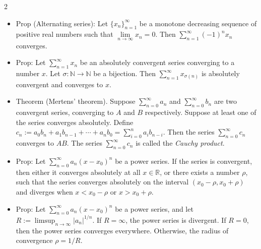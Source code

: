 \documentclass[a4paper,10pt]{article}
\begin{document}
\begin{multicols}{2}
\begin{itemize}
    (ii) If $L > 1$, then $\sum_{n=1}^{\infty} x_n$ diverges.
    \item Prop (Alternating series): Let $\{x_n\}_{n=1}^{\infty}$ be a monotone decreasing sequence of positive real numbers such that $\lim\limits_{n \to \infty} x_n = 0$. Then $\sum_{n=1}^{\infty} (-1)^n x_n$ converges.
    \item Prop: Let $\sum_{n=1}^{\infty} x_n$ be an absolutely convergent series converging to a number $x$. Let $\sigma: \mathbb{N} \to \mathbb{N}$ be a bijection. Then $\sum_{n=1}^{\infty} x_{\sigma(n)}$ is absolutely convergent and converges to $x$.
    \item Theorem (Mertens’ theorem). Suppose $\sum_{n=0}^{\infty} a_n$ and $\sum_{n=0}^{\infty} b_n$ are two convergent series, converging to $A$ and $B$ respectively. Suppose at least one of the series converges absolutely. Define $c_n := a_0 b_n + a_1 b_{n-1} + \cdots + a_n b_0 = \sum_{i=0}^{n} a_i b_{n-i}.$ Then the series $\sum_{n=0}^{\infty} c_n$ converges to $AB$. The series $\sum_{n=0}^{\infty} c_n$ is called the \textit{Cauchy product}.
    \item Prop: Let $\sum_{n=0}^{\infty} a_n (x - x_0)^n$ be a power series. If the series is convergent, then either it converges absolutely at all $x \in \mathbb{R}$, or there exists a number $\rho$, such that the series converges absolutely on the interval $(x_0 - \rho, x_0 + \rho)$ and diverges when $x < x_0 - \rho$ or $x > x_0 + \rho$.
    \item Prop: Let $\sum_{n=0}^{\infty} a_n (x - x_0)^n$ be a power series, and let $R := \limsup_{n \to \infty} |a_n|^{1/n}.$ If $R = \infty$, the power series is divergent. If $R = 0$, then the power series converges everywhere. Otherwise, the radius of convergence $\rho = 1/R$.
    

\end{itemize}


\end{multicols}
\end{document}
